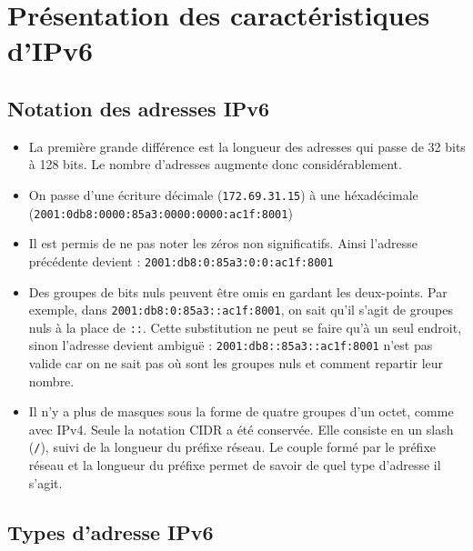 \section{Présentation des caractéristiques d’IPv6}
\subsection{Notation des adresses IPv6}
  
\begin{itemize}
  \item La première grande différence est la longueur des adresses qui passe de 32 bits à 128 bits. Le nombre d’adresses augmente donc considérablement.
  \item On passe d’une écriture décimale (\texttt{172.69.31.15}) à une héxadécimale (\texttt{2001:0db8:0000:85a3:0000:0000:ac1f:8001})
  \item Il est permis de ne pas noter les zéros non significatifs. Ainsi l'adresse précédente devient : \texttt{2001:db8:0:85a3:0:0:ac1f:8001}
  \item Des groupes de bits nuls peuvent être omis en gardant les deux-points. Par exemple, dans \texttt{2001:db8:0:85a3::ac1f:8001}, on sait qu'il s’agit de groupes nuls à la place de \texttt{::}. Cette substitution ne peut se faire qu’à un seul endroit, sinon l’adresse devient ambiguë : \texttt{2001:db8::85a3::ac1f:8001} n'est pas valide car on ne sait pas où sont les groupes nuls et comment repartir leur nombre.
  \item Il n’y a plus de masques sous la forme de quatre groupes d'un octet, comme avec IPv4.
Seule la notation CIDR a été conservée.
Elle consiste en un slash (\texttt{/}), suivi de la longueur du préfixe réseau.
Le couple formé par le préfixe réseau et la longueur du préfixe permet de savoir de quel type d’adresse il s’agit.
\end{itemize}

\subsection{Types d’adresse IPv6}

